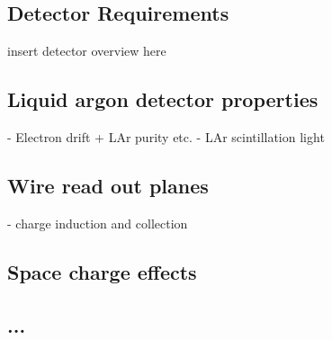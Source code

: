 

\subsection{Detector Requirements}

insert detector overview here

\subsection{Liquid argon detector properties}
- Electron drift + LAr purity etc.
- LAr scintillation light 

\subsection{Wire read out planes}
- charge induction and collection 

\subsection{Space charge effects}

\subsection{...}



